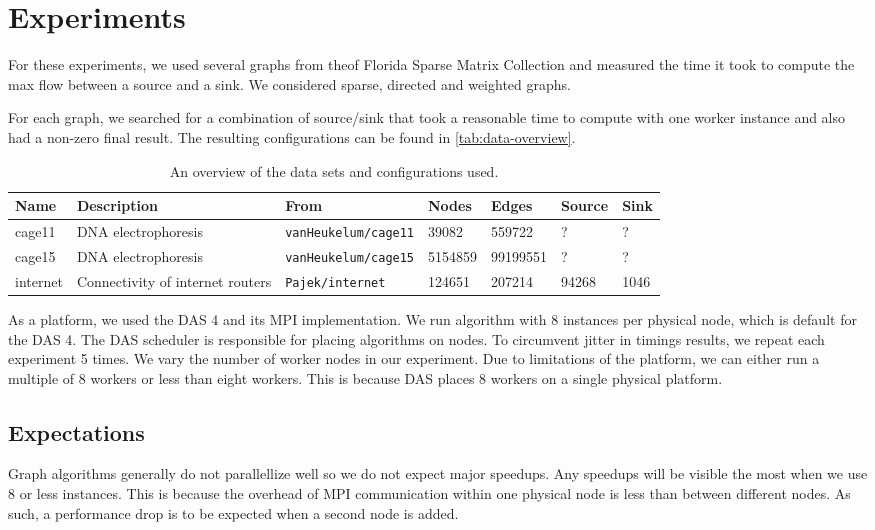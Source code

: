 \chapter{Experiments}
\label{chp:experiments}
For these experiments, we used several graphs from theof Florida Sparse Matrix Collection \cite{FloridaSparseMatrix}  and measured the time it took to compute the max flow between a source and a sink. We considered sparse, directed and weighted graphs.

For each graph, we searched for a combination of source/sink that took a reasonable time to compute with one worker instance and also had a non-zero final result. The resulting configurations can be found in \autoref{tab:data-overview}.

\begin{table}
	\centering

	\begin{tabularx}{\textwidth}{l | X | l | l | l | l | l}
		Name & Description & From & Nodes & Edges & Source & Sink \\
		\hline
		cage11 & DNA electrophoresis & \texttt{vanHeukelum/cage11} & 39082 & 559722 & ? & ? \\
		cage15 & DNA electrophoresis & \texttt{vanHeukelum/cage15} & 5154859 & 99199551 & ? & ? \\
		internet & Connectivity of internet routers & \texttt{Pajek/internet} & 124651 & 207214 & 94268 & 1046
	\end{tabularx}
	\caption{An overview of the data sets and configurations used.}
	\label{tab:data-overview}
\end{table}

As a platform, we used the DAS 4 and its MPI implementation. We run algorithm with 8 instances per physical node, which is default for the DAS 4. %
The DAS scheduler is responsible for placing algorithms on nodes. To circumvent jitter in timings results, we repeat each experiment 5 times. We vary the number of worker nodes in our experiment. Due to limitations of the platform, we can either run a multiple of 8 workers or less than eight workers. This is because DAS places 8 workers on a single physical platform.


\section{Expectations}
Graph algorithms generally do not parallellize well %
so we do not expect major speedups. Any speedups will be visible the most when we use 8 or less instances. This is because the overhead of MPI communication within one physical node is less than between different nodes. As such, a performance drop is to be expected when a second node is added.


